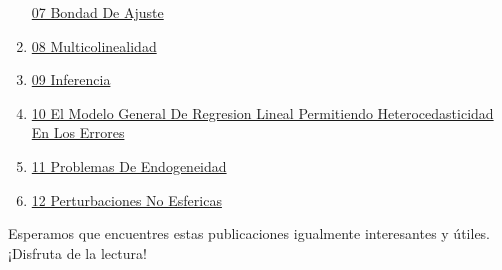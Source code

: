\documentclass[
  jou,
  floatsintext,
  longtable,
  a4paper,
  nolmodern,
  notxfonts,
  notimes,
  colorlinks=true,linkcolor=blue,citecolor=blue,urlcolor=blue]{apa7}
\begin{document}
\begin{enumerate}
  \href{https://achalmaedison.netlify.app/econometria/01-fundamentos-econometria/2021-04-19-07-bondad-de-ajuste}{07
  Bondad De Ajuste}
\item
  \href{https://achalmaedison.netlify.app/econometria/01-fundamentos-econometria/2021-04-26-08-multicolinealidad/index.pdf}{}
  \href{https://achalmaedison.netlify.app/econometria/01-fundamentos-econometria/2021-04-26-08-multicolinealidad}{08
  Multicolinealidad}
\item
  \href{https://achalmaedison.netlify.app/econometria/01-fundamentos-econometria/2021-05-03-09-inferencia/index.pdf}{}
  \href{https://achalmaedison.netlify.app/econometria/01-fundamentos-econometria/2021-05-03-09-inferencia}{09
  Inferencia}
\item
  \href{https://achalmaedison.netlify.app/econometria/01-fundamentos-econometria/2021-05-10-10-el-modelo-general-de-regresion-lineal-permitiendo-heterocedasticidad-en-los-errores/index.pdf}{}
  \href{https://achalmaedison.netlify.app/econometria/01-fundamentos-econometria/2021-05-10-10-el-modelo-general-de-regresion-lineal-permitiendo-heterocedasticidad-en-los-errores}{10
  El Modelo General De Regresion Lineal Permitiendo Heterocedasticidad
  En Los Errores}
\item
  \href{https://achalmaedison.netlify.app/econometria/01-fundamentos-econometria/2021-05-17-11-problemas-de-endogeneidad/index.pdf}{}
  \href{https://achalmaedison.netlify.app/econometria/01-fundamentos-econometria/2021-05-17-11-problemas-de-endogeneidad}{11
  Problemas De Endogeneidad}
\item
  \href{https://achalmaedison.netlify.app/econometria/01-fundamentos-econometria/2021-05-24-12-perturbaciones-no-esfericas/index.pdf}{}
  \href{https://achalmaedison.netlify.app/econometria/01-fundamentos-econometria/2021-05-24-12-perturbaciones-no-esfericas}{12
  Perturbaciones No Esfericas}
\end{enumerate}

Esperamos que encuentres estas publicaciones igualmente interesantes y
útiles. ¡Disfruta de la lectura!
\end{document}
